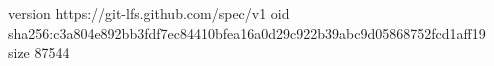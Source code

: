 version https://git-lfs.github.com/spec/v1
oid sha256:c3a804e892bb3fdf7ec84410bfea16a0d29c922b39abc9d05868752fcd1aff19
size 87544

